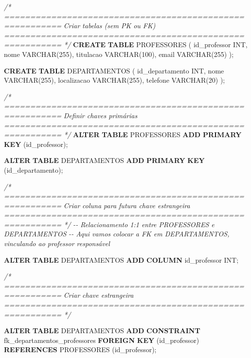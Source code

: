 \documentclass[
]{book}
\newenvironment{Shaded}{\begin{snugshade}}{\end{snugshade}}
\newcommand{\CommentTok}[1]{\textcolor[rgb]{0.56,0.35,0.01}{\textit{#1}}}
\newcommand{\DataTypeTok}[1]{\textcolor[rgb]{0.13,0.29,0.53}{#1}}
\newcommand{\DecValTok}[1]{\textcolor[rgb]{0.00,0.00,0.81}{#1}}
\newcommand{\KeywordTok}[1]{\textcolor[rgb]{0.13,0.29,0.53}{\textbf{#1}}}
\newcommand{\NormalTok}[1]{#1}
\begin{document}
\begin{Shaded}
\begin{Highlighting}[]
\CommentTok{/* =========================================================}
\CommentTok{   Criar tabelas (sem PK ou FK)}
\CommentTok{   ========================================================= */}
\KeywordTok{CREATE} \KeywordTok{TABLE}\NormalTok{ PROFESSORES }
\NormalTok{(}
\NormalTok{    id\_professor }\DataTypeTok{INT}\NormalTok{,}
\NormalTok{    nome }\DataTypeTok{VARCHAR}\NormalTok{(}\DecValTok{255}\NormalTok{),}
\NormalTok{    titulacao }\DataTypeTok{VARCHAR}\NormalTok{(}\DecValTok{100}\NormalTok{),}
\NormalTok{    email }\DataTypeTok{VARCHAR}\NormalTok{(}\DecValTok{255}\NormalTok{)}
\NormalTok{);}

\KeywordTok{CREATE} \KeywordTok{TABLE}\NormalTok{ DEPARTAMENTOS }
\NormalTok{(}
\NormalTok{    id\_departamento }\DataTypeTok{INT}\NormalTok{,}
\NormalTok{    nome }\DataTypeTok{VARCHAR}\NormalTok{(}\DecValTok{255}\NormalTok{),}
\NormalTok{    localizacao }\DataTypeTok{VARCHAR}\NormalTok{(}\DecValTok{255}\NormalTok{),}
\NormalTok{    telefone }\DataTypeTok{VARCHAR}\NormalTok{(}\DecValTok{20}\NormalTok{)}
\NormalTok{);}

\CommentTok{/* =========================================================}
\CommentTok{   Definir chaves primárias}
\CommentTok{   ========================================================= */}
\KeywordTok{ALTER} \KeywordTok{TABLE}\NormalTok{ PROFESSORES }\KeywordTok{ADD} \KeywordTok{PRIMARY} \KeywordTok{KEY}\NormalTok{ (id\_professor);}

\KeywordTok{ALTER} \KeywordTok{TABLE}\NormalTok{ DEPARTAMENTOS }\KeywordTok{ADD} \KeywordTok{PRIMARY} \KeywordTok{KEY}\NormalTok{ (id\_departamento);}

\CommentTok{/* =========================================================}
\CommentTok{   Criar coluna para futura chave estrangeira}
\CommentTok{   ========================================================= */}
\CommentTok{{-}{-} Relacionamento 1:1 entre PROFESSORES e DEPARTAMENTOS}
\CommentTok{{-}{-} Aqui vamos colocar a FK em DEPARTAMENTOS, vinculando ao professor responsável}

\KeywordTok{ALTER} \KeywordTok{TABLE}\NormalTok{ DEPARTAMENTOS }\KeywordTok{ADD} \KeywordTok{COLUMN}\NormalTok{ id\_professor }\DataTypeTok{INT}\NormalTok{;}

\CommentTok{/* =========================================================}
\CommentTok{   Criar chave estrangeira}
\CommentTok{   ========================================================= */}

\KeywordTok{ALTER} \KeywordTok{TABLE}\NormalTok{ DEPARTAMENTOS }\KeywordTok{ADD} \KeywordTok{CONSTRAINT}\NormalTok{ fk\_departamentos\_professores }\KeywordTok{FOREIGN} \KeywordTok{KEY}\NormalTok{ (id\_professor) }\KeywordTok{REFERENCES}\NormalTok{ PROFESSORES (id\_professor);}
\end{Highlighting}
\end{Shaded}
\end{document}
